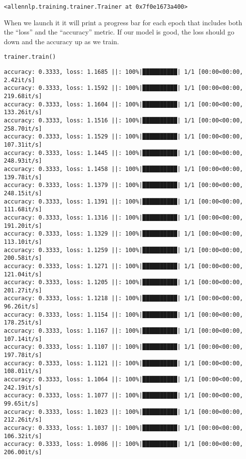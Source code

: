 \documentclass[
]{article}
\begin{document}
\begin{verbatim}
<allennlp.training.trainer.Trainer at 0x7f0e1673a400>
\end{verbatim}

When we launch it it will print a progress bar for each epoch that
includes both the ``loss'' and the ``accuracy'' metric. If our model is
good, the loss should go down and the accuracy up as we train.

\begin{verbatim}
trainer.train()
\end{verbatim}

\begin{verbatim}
accuracy: 0.3333, loss: 1.1685 ||: 100%|██████████| 1/1 [00:00<00:00,  2.42it/s]
accuracy: 0.3333, loss: 1.1592 ||: 100%|██████████| 1/1 [00:00<00:00, 219.68it/s]
accuracy: 0.3333, loss: 1.1604 ||: 100%|██████████| 1/1 [00:00<00:00, 133.26it/s]
accuracy: 0.3333, loss: 1.1516 ||: 100%|██████████| 1/1 [00:00<00:00, 258.70it/s]
accuracy: 0.3333, loss: 1.1529 ||: 100%|██████████| 1/1 [00:00<00:00, 107.31it/s]
accuracy: 0.3333, loss: 1.1445 ||: 100%|██████████| 1/1 [00:00<00:00, 248.93it/s]
accuracy: 0.3333, loss: 1.1458 ||: 100%|██████████| 1/1 [00:00<00:00, 139.78it/s]
accuracy: 0.3333, loss: 1.1379 ||: 100%|██████████| 1/1 [00:00<00:00, 248.15it/s]
accuracy: 0.3333, loss: 1.1391 ||: 100%|██████████| 1/1 [00:00<00:00, 111.68it/s]
accuracy: 0.3333, loss: 1.1316 ||: 100%|██████████| 1/1 [00:00<00:00, 191.20it/s]
accuracy: 0.3333, loss: 1.1329 ||: 100%|██████████| 1/1 [00:00<00:00, 113.10it/s]
accuracy: 0.3333, loss: 1.1259 ||: 100%|██████████| 1/1 [00:00<00:00, 200.58it/s]
accuracy: 0.3333, loss: 1.1271 ||: 100%|██████████| 1/1 [00:00<00:00, 121.04it/s]
accuracy: 0.3333, loss: 1.1205 ||: 100%|██████████| 1/1 [00:00<00:00, 201.27it/s]
accuracy: 0.3333, loss: 1.1218 ||: 100%|██████████| 1/1 [00:00<00:00, 96.26it/s]
accuracy: 0.3333, loss: 1.1154 ||: 100%|██████████| 1/1 [00:00<00:00, 178.25it/s]
accuracy: 0.3333, loss: 1.1167 ||: 100%|██████████| 1/1 [00:00<00:00, 107.14it/s]
accuracy: 0.3333, loss: 1.1107 ||: 100%|██████████| 1/1 [00:00<00:00, 197.78it/s]
accuracy: 0.3333, loss: 1.1121 ||: 100%|██████████| 1/1 [00:00<00:00, 108.01it/s]
accuracy: 0.3333, loss: 1.1064 ||: 100%|██████████| 1/1 [00:00<00:00, 242.19it/s]
accuracy: 0.3333, loss: 1.1077 ||: 100%|██████████| 1/1 [00:00<00:00, 99.65it/s]
accuracy: 0.3333, loss: 1.1023 ||: 100%|██████████| 1/1 [00:00<00:00, 212.26it/s]
accuracy: 0.3333, loss: 1.1037 ||: 100%|██████████| 1/1 [00:00<00:00, 106.32it/s]
accuracy: 0.3333, loss: 1.0986 ||: 100%|██████████| 1/1 [00:00<00:00, 206.00it/s]

\end{verbatim}
\end{document}
